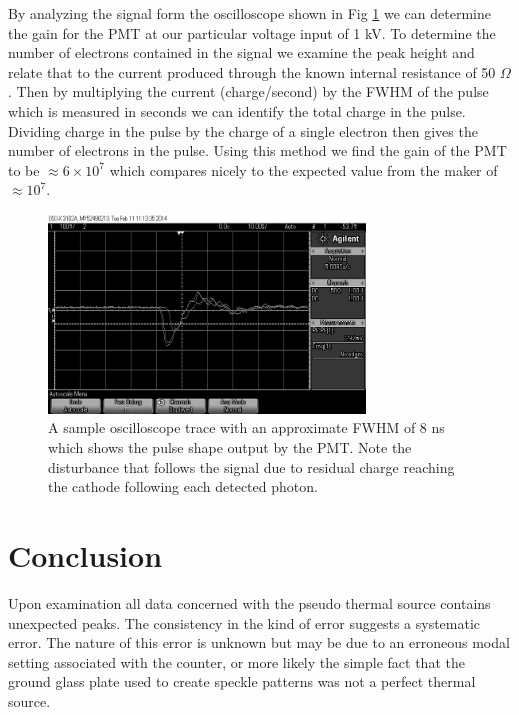 \documentclass[prb,preprint]{revtex4-1}
\begin{document}
\newpage

By analyzing the signal form the oscilloscope shown in Fig \ref{LC1} we can determine the gain for the PMT at our particular voltage input of 1 kV. To determine the number of electrons contained in the signal we examine the peak height and relate that to the current produced through the known internal resistance of 50 $\Omega$. Then by multiplying the current (charge/second) by the FWHM of the pulse which is measured in seconds we can identify the total charge in the pulse. Dividing charge in the pulse by the charge of a single electron then gives the number of electrons in the pulse. Using this method we find the gain of the PMT to be $\approx6\times10^7$ which compares nicely to the expected value from the maker of $\approx10^7$.

\begin{figure}[h]
\centering
\includegraphics[width=0.75\textwidth]{scope_1.png}
\caption{A sample oscilloscope trace with an approximate FWHM of 8 ns which shows the pulse shape output by the PMT. Note the disturbance that follows the signal due to residual charge reaching the cathode following each detected photon.}
\label{LC1}
\end{figure}


\section{Conclusion}

Upon examination all data concerned with the pseudo thermal source contains unexpected peaks. The consistency in the kind of error suggests a systematic error. The nature of this error is unknown but may be due to an erroneous modal setting associated with the counter, or more likely the simple fact that the ground glass plate used to create speckle patterns was not a perfect thermal source.
\end{document}
